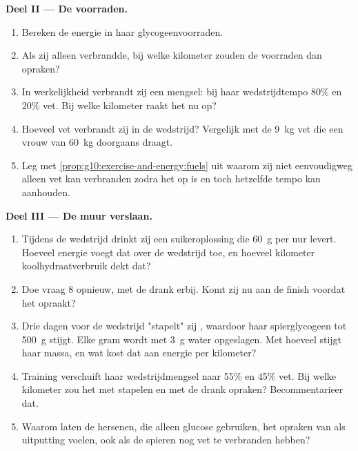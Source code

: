 \begin{problem}
\medskip
\noindent\textbf{Deel II --- De voorraden.}
\begin{enumerate}[resume]
  \item Bereken de energie in haar glycogeenvoorraden.
  \item Als zij alleen  verbrandde, bij welke kilometer zouden
        de voorraden dan opraken?
  \item In werkelijkheid verbrandt zij een mengsel: bij haar
        wedstrijdtempo 80\%  en 20\% vet. Bij welke kilometer
        raakt het  nu op?
  \item Hoeveel vet verbrandt zij in de wedstrijd? Vergelijk met de
        \qty{9}{kg} vet die een vrouw van \qty{60}{kg} doorgaans draagt.
  \item Leg met \cref{prop:g10:exercise-and-energy:fuels} uit waarom zij
        niet eenvoudigweg alleen vet kan verbranden zodra het 
        op is en toch hetzelfde tempo kan aanhouden.
\end{enumerate}

\medskip
\noindent\textbf{Deel III --- De muur verslaan.}
\begin{enumerate}[resume]
  \item Tijdens de wedstrijd drinkt zij een suikeroplossing die
        \qty{60}{g}  per uur levert. Hoeveel energie voegt dat
        over de wedstrijd toe, en hoeveel kilometer koolhydraatverbruik
        dekt dat?
  \item Doe vraag 8 opnieuw, met de drank erbij. Komt zij nu aan de
        finish voordat het  opraakt?
  \item Drie dagen voor de wedstrijd "stapelt" zij , waardoor
        haar spierglycogeen tot \qty{500}{g} stijgt. Elke gram wordt met
        \qty{3}{g} water opgeslagen. Met hoeveel stijgt haar massa, en
        wat kost dat aan energie per kilometer?
  \item Training verschuift haar wedstrijdmengsel naar 55\% 
        en 45\% vet. Bij welke kilometer zou het  met stapelen
        en met de drank opraken? Becommentarieer dat.
  \item Waarom laten de hersenen, die alleen glucose gebruiken, het
        opraken van  als uitputting voelen, ook als de spieren
        nog vet te verbranden hebben?
\end{enumerate}


\end{problem}
